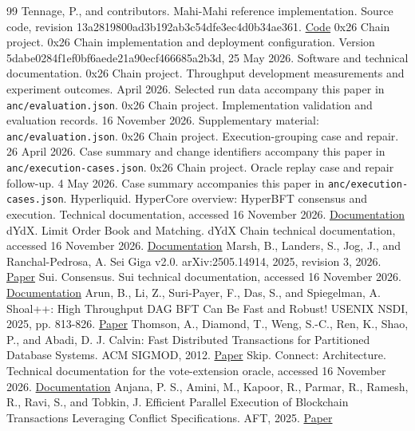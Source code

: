 \documentclass[11pt]{article}
\begin{document}
\begin{thebibliography}{99}
 Tennage, P., and contributors. Mahi-Mahi reference implementation. Source code, revision 13a2819800ad3b192ab3c54dfe3ec4d0b34ae361. \href{https://github.com/PasinduTennage/mahi-mahi-consensus}{Code}
 0x26 Chain project. 0x26 Chain implementation and deployment configuration. Version 5dabe0284f1ef0bf6aede21a90ecf466685a2b3d, 25 May 2026. Software and technical documentation.
 0x26 Chain project. Throughput development measurements and experiment outcomes. April 2026. Selected run data accompany this paper in \texttt{anc/evaluation.json}.
 0x26 Chain project. Implementation validation and evaluation records. 16 November 2026. Supplementary material: \texttt{anc/evaluation.json}.
 0x26 Chain project. Execution-grouping case and repair. 26 April 2026. Case summary and change identifiers accompany this paper in \texttt{anc/execution-cases.json}.
 0x26 Chain project. Oracle replay case and repair follow-up. 4 May 2026. Case summary accompanies this paper in \texttt{anc/execution-cases.json}.
 Hyperliquid. HyperCore overview: HyperBFT consensus and execution. Technical documentation, accessed 16 November 2026. \href{https://hyperliquid.gitbook.io/hyperliquid-docs/hypercore/overview}{Documentation}
 dYdX. Limit Order Book and Matching. dYdX Chain technical documentation, accessed 16 November 2026. \href{https://docs.dydx.exchange/concepts-limit-order-book-and-matching}{Documentation}
 Marsh, B., Landers, S., Jog, J., and Ranchal-Pedrosa, A. Sei Giga v2.0. arXiv:2505.14914, 2025, revision 3, 2026. \href{https://arxiv.org/abs/2505.14914v3}{Paper}
 Sui. Consensus. Sui technical documentation, accessed 16 November 2026. \href{https://docs.sui.io/develop/sui-architecture/consensus}{Documentation}
 Arun, B., Li, Z., Suri-Payer, F., Das, S., and Spiegelman, A. Shoal++: High Throughput DAG BFT Can Be Fast and Robust! USENIX NSDI, 2025, pp. 813-826. \href{https://www.usenix.org/conference/nsdi25/presentation/arun}{Paper}
 Thomson, A., Diamond, T., Weng, S.-C., Ren, K., Shao, P., and Abadi, D. J. Calvin: Fast Distributed Transactions for Partitioned Database Systems. ACM SIGMOD, 2012. \href{https://www.cs.yale.edu/homes/dna/papers/calvin-sigmod12.pdf}{Paper}
 Skip. Connect: Architecture. Technical documentation for the vote-extension oracle, accessed 16 November 2026. \href{https://docs.skip.build/connect/learn/architecture}{Documentation}
 Anjana, P. S., Amini, M., Kapoor, R., Parmar, R., Ramesh, R., Ravi, S., and Tobkin, J. Efficient Parallel Execution of Blockchain Transactions Leveraging Conflict Specifications. AFT, 2025. \href{https://arxiv.org/abs/2503.03203v2}{Paper}

\end{thebibliography}
\end{document}
